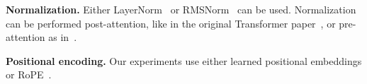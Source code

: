 \textbf{Normalization.} Either LayerNorm~\citep{ba2016layer} or RMSNorm~\citep{zhang2019root} can be used. Normalization can be performed post-attention, like in the original Transformer paper~\citep{vaswani2017attention}, or pre-attention as in~\citep{xiong2020layer}.

\textbf{Positional encoding.} Our experiments use either learned positional embeddings or RoPE~\citep{suRoFormerEnhancedTransformer2023}.

